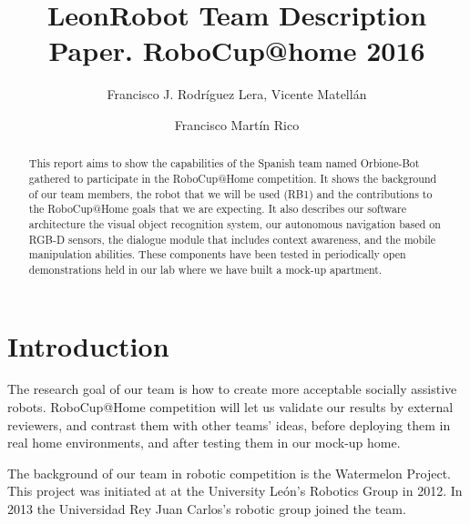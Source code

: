 \documentclass[citeauthoryear]{llncs}
\begin{document}
\title{LeonRobot Team Description Paper. RoboCup@home 2016  }

\author{Francisco J. Rodr\'iguez Lera, Vicente Matell\'an \and Francisco Mart\'in Rico}


\titlerunning  \toctitle
\authorrunning \tocauthor

\maketitle
%
\begin{abstract}
This report aims to show the capabilities of the Spanish team named Orbione-Bot gathered to participate in the RoboCup@Home competition. It shows the background of our team members, the robot that we will be used (RB1) and the contributions to the RoboCup@Home goals that we are expecting. It also describes our software architecture the visual object recognition system, our autonomous navigation based on RGB-D sensors, the dialogue module that includes context awareness, and the mobile manipulation abilities. These components have been tested in periodically open demonstrations held in our lab where we have built a mock-up apartment. 

\end{abstract}
%
\section{Introduction}


The research goal of our team is how to create more acceptable socially assistive robots. RoboCup@Home competition will let us validate our results by external reviewers, and contrast them with other teams' ideas,  before deploying them in real home environments, and after testing them in our mock-up home.

The background of our team in robotic competition is the Watermelon Project. This project was initiated at at the University Le\'on's  Robotics Group in 2012. In 2013  the Universidad Rey Juan Carlos's robotic group joined the team. 



\end{document}
